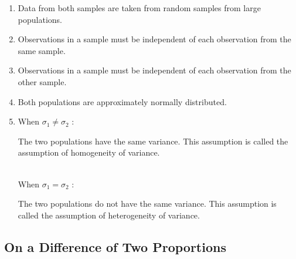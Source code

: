 \begin{assumptions}
\begin{enumerate}
\item Data from both samples are taken from random samples from large populations.			
\item Observations in a sample must be independent of each observation from the same sample.	
\item Observations in a sample must be independent of each observation from the other sample.	
\item	Both populations are approximately normally distributed.								
\item When $\sigma_{1} \neq \sigma_{2}$	\tabto{4.25cm} : \begin{minipage}[t]{10.75cm}
								The two populations have the same variance. 
								This assumption is called the assumption of 
								homogeneity of variance.\\
								\end{minipage}
	\hfill\\
        	When $\sigma_{1} = \sigma_{2}$	\tabto{4.25cm} : \begin{minipage}[t]{10.75cm}
								The two populations do not have the same variance.
								This assumption is called the assumption of 
								heterogeneity of variance.
								\end{minipage}
\end{enumerate}
\end{assumptions}








\subsection{On a Difference of Two Proportions}

